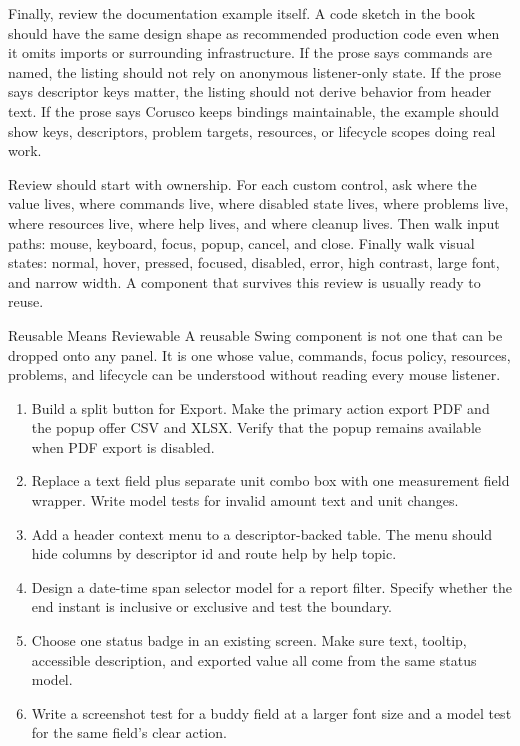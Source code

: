 Finally, review the documentation example itself. A code sketch in the book should have
the same design shape as recommended production code even when it omits imports or
surrounding infrastructure. If the prose says commands are named, the listing should
not rely on anonymous listener-only state. If the prose says descriptor keys matter,
the listing should not derive behavior from header text. If the prose says Corusco
keeps bindings maintainable, the example should show keys, descriptors, problem
targets, resources, or lifecycle scopes doing real work.

Review should start with ownership. For each custom control, ask where the value lives,
where commands live, where disabled state lives, where problems live, where resources
live, where help lives, and where cleanup lives. Then walk input paths: mouse, keyboard,
focus, popup, cancel, and close. Finally walk visual states: normal, hover, pressed,
focused, disabled, error, high contrast, large font, and narrow width. A component that
survives this review is usually ready to reuse.

\begin{principlebox}{Reusable Means Reviewable}
A reusable Swing component is not one that can be dropped onto any panel. It is one
whose value, commands, focus policy, resources, problems, and lifecycle can be
understood without reading every mouse listener.
\end{principlebox}

\begin{exercisebox}
\begin{enumerate}
\item Build a split button for Export. Make the primary action export PDF and
the popup offer CSV and XLSX. Verify that the popup remains available when PDF export is
disabled.
\item Replace a text field plus separate unit combo box with one measurement
field wrapper. Write model tests for invalid amount text and unit changes.
\item Add a header context menu to a descriptor-backed table. The menu should
hide columns by descriptor id and route help by help topic.
\item Design a date-time span selector model for a report filter. Specify
whether the end instant is inclusive or exclusive and test the boundary.
\item Choose one status badge in an existing screen. Make sure text,
tooltip, accessible description, and exported value all come from the same status model.
\item Write a screenshot test for a buddy field at a larger font size and a
model test for the same field's clear action.
\end{enumerate}
\end{exercisebox}

